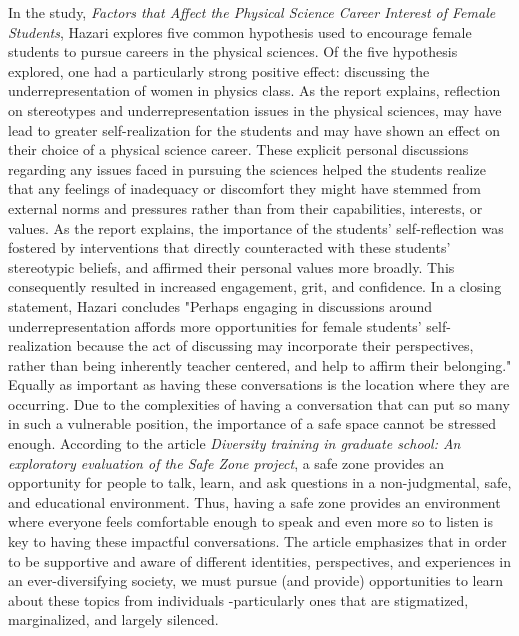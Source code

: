 \documentclass[12pt]{article}
\begin{document}
		In the study, \textit{Factors that Affect the Physical Science Career Interest of Female Students}, Hazari explores five common hypothesis used to encourage female students to pursue careers in the physical sciences. Of the five hypothesis explored, one had a particularly strong positive effect: discussing the underrepresentation of women in physics class. As the report explains, reflection on stereotypes and underrepresentation issues in the physical sciences, may have lead to greater self-realization for the students and may have shown an effect on their choice of a physical science career. These explicit personal discussions regarding any issues faced in pursuing the sciences helped the students realize that any feelings of inadequacy or discomfort they might have stemmed from external norms and pressures rather than from their capabilities, interests, or values. As the report explains, the importance of the students' self-reflection was fostered by interventions that directly counteracted with these students' stereotypic beliefs, and affirmed their personal values more broadly. This consequently resulted in increased engagement, grit, and confidence. In a closing statement, Hazari concludes "Perhaps engaging in discussions around underrepresentation affords more opportunities for female students' self-realization because the act of discussing may incorporate their perspectives, rather than being inherently teacher centered, and help to affirm their belonging."\cite{hazari}\\
		
		Equally as important as having these conversations is the location where they are occurring. Due to the complexities of having a conversation that can put so many in such a vulnerable position, the importance of a safe space cannot be stressed enough. According to the article \textit{Diversity training in graduate school: An exploratory evaluation of the Safe Zone project}, a safe zone provides an opportunity for people to talk, learn, and ask questions in a non-judgmental, safe, and educational environment. Thus, having a safe zone provides an environment where everyone feels comfortable enough to speak and even more so to listen is key to having these impactful conversations. The article emphasizes that in order to be supportive and aware of different identities, perspectives, and experiences in an ever-diversifying society, we must pursue (and provide) opportunities to learn about these topics from individuals -particularly ones that are stigmatized, marginalized, and largely silenced\cite{safezone}. \\
		
\end{document}
